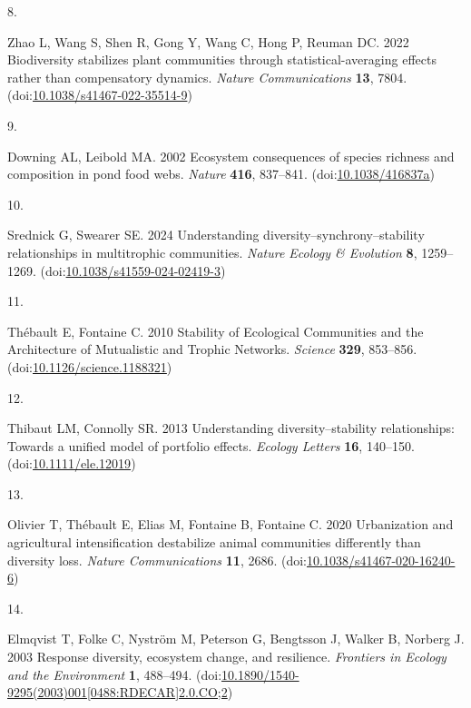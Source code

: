 \documentclass[
]{article}
\newlength{\cslhangindent}
\newlength{\csllabelwidth}
\newlength{\cslentryspacingunit} %
\newenvironment{CSLReferences}[2] %
 {%
  \setlength{\parindent}{0pt}
  \ifodd #1
  \let\oldpar\par
  \def\par{\hangindent=\cslhangindent\oldpar}
  \fi
  \setlength{\parskip}{#2\cslentryspacingunit}
 }%
 {}
\newcommand{\CSLLeftMargin}[1]{\parbox[t]{\csllabelwidth}{#1}}
\newcommand{\CSLRightInline}[1]{\parbox[t]{\linewidth - \csllabelwidth}{#1}\break}
\begin{document}
\begin{CSLReferences}{0}{0}
\leavevmode{}%
\CSLLeftMargin{8. }%
\CSLRightInline{Zhao L, Wang S, Shen R, Gong Y, Wang C, Hong P, Reuman DC. 2022 Biodiversity stabilizes plant communities through statistical-averaging effects rather than compensatory dynamics. \emph{Nature Communications} \textbf{13}, 7804. (doi:\href{https://doi.org/10.1038/s41467-022-35514-9}{10.1038/s41467-022-35514-9})}

\leavevmode{}%
\CSLLeftMargin{9. }%
\CSLRightInline{Downing AL, Leibold MA. 2002 Ecosystem consequences of species richness and composition in pond food webs. \emph{Nature} \textbf{416}, 837--841. (doi:\href{https://doi.org/10.1038/416837a}{10.1038/416837a})}

\leavevmode{}%
\CSLLeftMargin{10. }%
\CSLRightInline{Srednick G, Swearer SE. 2024 Understanding diversity--synchrony--stability relationships in multitrophic communities. \emph{Nature Ecology \& Evolution} \textbf{8}, 1259--1269. (doi:\href{https://doi.org/10.1038/s41559-024-02419-3}{10.1038/s41559-024-02419-3})}

\leavevmode{}%
\CSLLeftMargin{11. }%
\CSLRightInline{Thébault E, Fontaine C. 2010 Stability of {Ecological} {Communities} and the {Architecture} of {Mutualistic} and {Trophic} {Networks}. \emph{Science} \textbf{329}, 853--856. (doi:\href{https://doi.org/10.1126/science.1188321}{10.1126/science.1188321})}

\leavevmode{}%
\CSLLeftMargin{12. }%
\CSLRightInline{Thibaut LM, Connolly SR. 2013 Understanding diversity--stability relationships: Towards a unified model of portfolio effects. \emph{Ecology Letters} \textbf{16}, 140--150. (doi:\href{https://doi.org/10.1111/ele.12019}{10.1111/ele.12019})}

\leavevmode{}%
\CSLLeftMargin{13. }%
\CSLRightInline{Olivier T, Thébault E, Elias M, Fontaine B, Fontaine C. 2020 Urbanization and agricultural intensification destabilize animal communities differently than diversity loss. \emph{Nature Communications} \textbf{11}, 2686. (doi:\href{https://doi.org/10.1038/s41467-020-16240-6}{10.1038/s41467-020-16240-6})}

\leavevmode{}%
\CSLLeftMargin{14. }%
\CSLRightInline{Elmqvist T, Folke C, Nyström M, Peterson G, Bengtsson J, Walker B, Norberg J. 2003 Response diversity, ecosystem change, and resilience. \emph{Frontiers in Ecology and the Environment} \textbf{1}, 488--494. (doi:\href{https://doi.org/10.1890/1540-9295(2003)001\%5B0488:RDECAR\%5D2.0.CO;2}{10.1890/1540-9295(2003)001{[}0488:RDECAR{]}2.0.CO;2})}


\end{CSLReferences}
\end{document}
